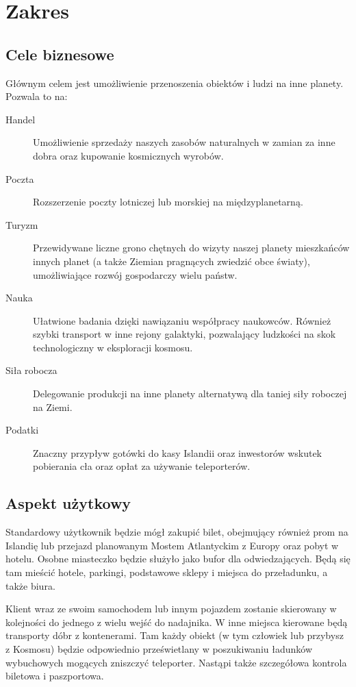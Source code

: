 \section{Zakres} 
\subsection{Cele biznesowe}
Głównym celem jest umożliwienie przenoszenia obiektów i ludzi na inne planety.
Pozwala to na:
\begin{description}
\item[Handel] Umożliwienie sprzedaży naszych zasobów naturalnych w zamian za inne dobra oraz kupowanie kosmicznych wyrobów.
\item[Poczta] Rozszerzenie poczty lotniczej lub morskiej na międzyplanetarną.
\item[Turyzm] Przewidywane liczne grono chętnych do wizyty naszej planety mieszkańców innych planet (a także Ziemian pragnących zwiedzić obce światy), umożliwiające rozwój gospodarczy wielu państw.
\item[Nauka] Ułatwione badania dzięki nawiązaniu współpracy naukowców. Również szybki transport w inne rejony galaktyki, pozwalający ludzkości na skok technologiczny w eksploracji kosmosu.
\item[Siła robocza] Delegowanie produkcji na inne planety alternatywą dla taniej siły roboczej na Ziemi.
\item[Podatki] Znaczny przypływ gotówki do kasy Islandii oraz inwestorów wskutek pobierania cła oraz opłat za używanie teleporterów.
\end{description}

\subsection{Aspekt użytkowy}
Standardowy użytkownik będzie mógł zakupić bilet, obejmujący również prom na Islandię lub przejazd planowanym Mostem Atlantyckim z Europy oraz pobyt w hotelu.
Osobne miasteczko będzie służyło jako bufor dla odwiedzających.
Będą się tam mieścić hotele, parkingi, podstawowe sklepy i miejsca do przeładunku, a także biura.

Klient wraz ze swoim samochodem lub innym pojazdem zostanie skierowany w kolejności do jednego z wielu wejść do nadajnika.
W inne miejsca kierowane będą transporty dóbr z kontenerami.
Tam każdy obiekt (w tym człowiek lub przybysz z Kosmosu) będzie odpowiednio prześwietlany w poszukiwaniu ładunków wybuchowych mogących zniszczyć teleporter.
Nastąpi także szczegółowa kontrola biletowa i paszportowa.

